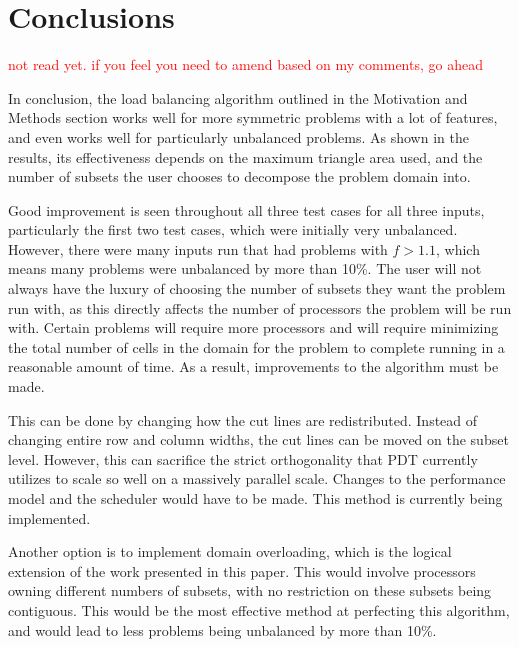 \documentclass{anstrans}
\newcommand{\tcr}[1]{\textcolor{red}{#1}}
\begin{document}
\section{Conclusions}
\tcr{not read yet. if you feel you need to amend based on my comments, go ahead}

In conclusion, the load balancing algorithm outlined in the Motivation and Methods section works well for more symmetric problems with a lot of features, and even works well for particularly unbalanced problems. As shown in the results, its effectiveness depends on the maximum triangle area used, and the number of subsets the user chooses to decompose the problem domain into. 

Good improvement is seen throughout all three test cases for all three inputs, particularly the first two test cases, which were initially very unbalanced. However, there were many inputs run that had problems with $f > 1.1$, which means many problems were unbalanced by more than 10\%. The user will not always have the luxury of choosing the number of subsets they want the problem run with, as this directly affects the number of processors the problem will be run with. Certain problems will require more processors and will require minimizing the total number of cells in the domain for the problem to complete running in a reasonable amount of time. As a result, improvements to the algorithm must be made. 

This can be done by changing how the cut lines are redistributed. Instead of changing entire row and column widths, the cut lines can be moved on the subset level. However, this can sacrifice the strict orthogonality that PDT currently utilizes to scale so well on a massively parallel scale\cite{mpadams2015}. Changes to the performance model and the scheduler would have to be made. This method is currently being implemented.

Another option is to implement domain overloading\cite{mpadams2015}, which is the logical extension of the work presented in this paper. This would involve processors owning different numbers of subsets, with no restriction on these subsets being contiguous. This would be the most effective method at perfecting this algorithm, and would lead to less problems being unbalanced by more than 10\%.

%
\end{document}
